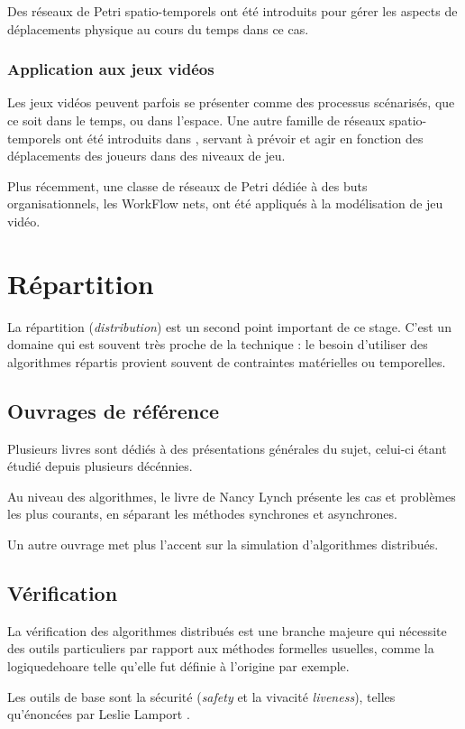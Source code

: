 Des réseaux de Petri spatio-temporels ont été introduits\cite{zhang2014modeling} pour gérer les aspects de déplacements physique au cours du temps dans ce cas.

\subsubsection{Application aux jeux vidéos}
Les jeux vidéos peuvent parfois se présenter comme des processus scénarisés, que ce soit dans le temps, ou dans l'espace.
Une autre famille de réseaux spatio-temporels ont été introduits dans \cite{natkin2004new}, servant à prévoir et agir en fonction des déplacements des joueurs dans des niveaux de jeu.

Plus récemment, une classe de réseaux de Petri dédiée à des buts organisationnels, les WorkFlow nets\cite{oliveira2011game}, ont été appliqués à la modélisation de jeu vidéo.
\section{Répartition}
La répartition (\textit{distribution}) est un second point important de ce stage. C'est un domaine qui est souvent très proche de la technique : le besoin d'utiliser des algorithmes répartis provient souvent de contraintes matérielles ou temporelles.

\subsection{Ouvrages de référence}
Plusieurs livres sont dédiés à des présentations générales du sujet, celui-ci étant étudié depuis plusieurs décénnies.

Au niveau des algorithmes, le livre de Nancy Lynch \cite{lynch1996distributed} présente les cas et problèmes les plus courants, en séparant les méthodes synchrones et asynchrones. 

Un autre ouvrage \cite{attiya2004distributed} met plus l'accent sur la simulation d'algorithmes distribués.

\subsection{Vérification}
La vérification des algorithmes distribués est une branche majeure qui nécessite des outils particuliers par rapport aux méthodes formelles usuelles, comme la \gls{logiquedehoare} telle qu'elle fut définie à l'origine par exemple.

Les outils de base sont la sécurité (\textit{safety} et la vivacité \textit{liveness}), telles qu'énoncées par Leslie Lamport \cite{lamport1977proving}.

